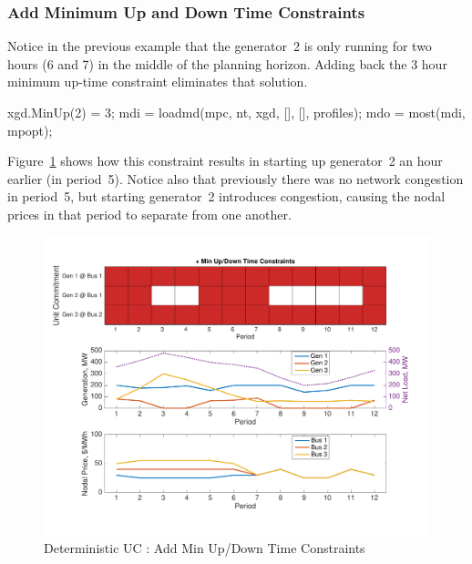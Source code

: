 \documentclass[12pt]{article}
\numberwithin{equation}{section}
\numberwithin{table}{section}
\numberwithin{figure}{section}
\begin{document}
\subsubsection*{Add Minimum Up and Down Time Constraints}
Notice in the previous example that the generator~2 is only running for two hours (6 and 7) in the middle of the planning horizon. Adding back the 3 hour minimum up-time constraint eliminates that solution.
\begin{Code}
xgd.MinUp(2) = 3;
mdi = loadmd(mpc, nt, xgd, [], [], profiles);
mdo = most(mdi, mpopt);
\end{Code}
Figure~\ref{fig:uc_ex_4} shows how this constraint results in starting up generator~2 an hour earlier (in period~5). Notice also that previously there was no network congestion in period~5, but starting generator~2 introduces congestion, causing the nodal prices in that period to separate from one another.
\begin{figure}[hbtp]
  \centering
  \includegraphics[width=\textwidth]{./figures/uc-ex-4}
  \caption{Deterministic UC : Add Min Up/Down Time Constraints}
  \label{fig:uc_ex_4}
\end{figure}
\end{document}
